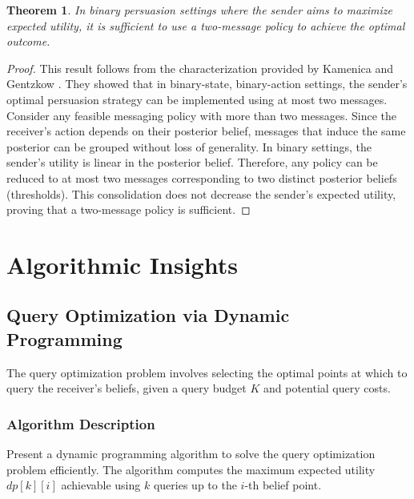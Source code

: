\documentclass[12pt]{article}
\newtheorem{theorem}{Theorem}
\begin{document}
\begin{theorem}
In binary persuasion settings where the sender aims to maximize expected utility, it is sufficient to use a two-message policy to achieve the optimal outcome.
\end{theorem}

\begin{proof}
This result follows from the characterization provided by Kamenica and Gentzkow \cite{Kamenica2011}. They showed that in binary-state, binary-action settings, the sender's optimal persuasion strategy can be implemented using at most two messages. Consider any feasible messaging policy with more than two messages. Since the receiver’s action depends on their posterior belief, messages that induce the same posterior can be grouped without loss of generality. In binary settings, the sender’s utility is linear in the posterior belief. Therefore, any policy can be reduced to at most two messages corresponding to two distinct posterior beliefs (thresholds). This consolidation does not decrease the sender’s expected utility, proving that a two-message policy is sufficient.
\end{proof}

\section{Algorithmic Insights}

\subsection{Query Optimization via Dynamic Programming}

The query optimization problem involves selecting the optimal points at which to query the receiver's beliefs, given a query budget \( K \) and potential query costs.

\subsubsection{Algorithm Description}

Present a dynamic programming algorithm to solve the query optimization problem efficiently. The algorithm computes the maximum expected utility \( dp[k][i] \) achievable using \( k \) queries up to the \( i \)-th belief point.
\end{document}
